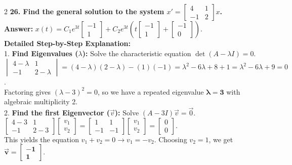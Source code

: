 \documentclass[4pt]{extarticle}
\begin{document}
\begin{multicols}{2}
\textbf{26. Find the general solution to the system $x' = \begin{bmatrix} 4 & 1 \\ -1 & 2 \end{bmatrix}x$.} \\
\textbf{Answer:} $x(t) = C_1 e^{3t} \begin{bmatrix} -1 \\ 1 \end{bmatrix} + C_2 e^{3t} \left( t \begin{bmatrix} -1 \\ 1 \end{bmatrix} + \begin{bmatrix} -1 \\ 0 \end{bmatrix} \right)$. \\
\textbf{Detailed Step-by-Step Explanation:} \\
1. \textbf{Find Eigenvalues ($\lambda$):} Solve the characteristic equation $\det(A - \lambda I) = 0$. \\
$\begin{vmatrix} 4-\lambda & 1 \\ -1 & 2-\lambda \end{vmatrix} = (4-\lambda)(2-\lambda) - (1)(-1) = \lambda^2 - 6\lambda + 8 + 1 = \lambda^2 - 6\lambda + 9 = 0$. \\
Factoring gives $(\lambda-3)^2 = 0$, so we have a repeated eigenvalue $\mathbf{\lambda = 3}$ with algebraic multiplicity 2. \\
2. \textbf{Find the first Eigenvector ($\vec{v}$):} Solve $(A - 3I)\vec{v} = \vec{0}$. \\
$\begin{bmatrix} 4-3 & 1 \\ -1 & 2-3 \end{bmatrix} \begin{bmatrix} v_1 \\ v_2 \end{bmatrix} = \begin{bmatrix} 1 & 1 \\ -1 & -1 \end{bmatrix} \begin{bmatrix} v_1 \\ v_2 \end{bmatrix} = \begin{bmatrix} 0 \\ 0 \end{bmatrix}$. \\
This yields the equation $v_1 + v_2 = 0 \rightarrow v_1 = -v_2$. Choosing $v_2 = 1$, we get $\mathbf{\vec{v} = \begin{bmatrix} -1 \\ 1 \end{bmatrix}}$. \\

\end{multicols}
\end{document}
